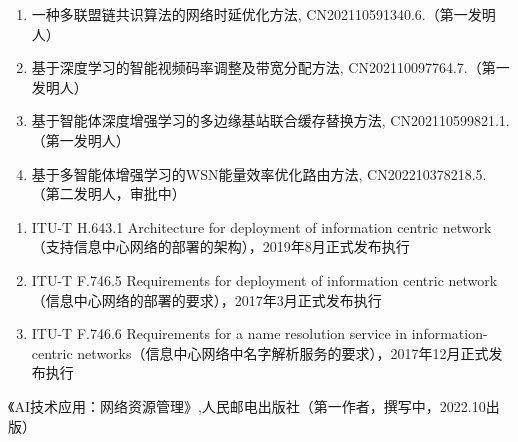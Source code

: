 \documentclass{resume}
\begin{document}
\begin{enumerate}
    \item 一种多联盟链共识算法的网络时延优化方法, CN202110591340.6.（第一发明人）
    \item 基于深度学习的智能视频码率调整及带宽分配方法, CN202110097764.7.（第一发明人）
    \item 基于智能体深度增强学习的多边缘基站联合缓存替换方法, CN202110599821.1.（第一发明人）
    \item 基于多智能体增强学习的WSN能量效率优化路由方法, CN202210378218.5.（第二发明人，审批中）
\end{enumerate}
\begin{enumerate}
    \item ITU-T H.643.1 Architecture for deployment of information centric network（支持信息中心网络的部署的架构），2019年8月正式发布执行
    \item ITU-T F.746.5 Requirements for deployment of information centric network（信息中心网络的部署的要求），2017年3月正式发布执行
    \item ITU-T F.746.6 Requirements for a name resolution service in information-centric networks（信息中心网络中名字解析服务的要求），2017年12月正式发布执行
\end{enumerate}
《AI技术应用：网络资源管理》,人民邮电出版社（第一作者，撰写中，2022.10出版）
\end{document}
